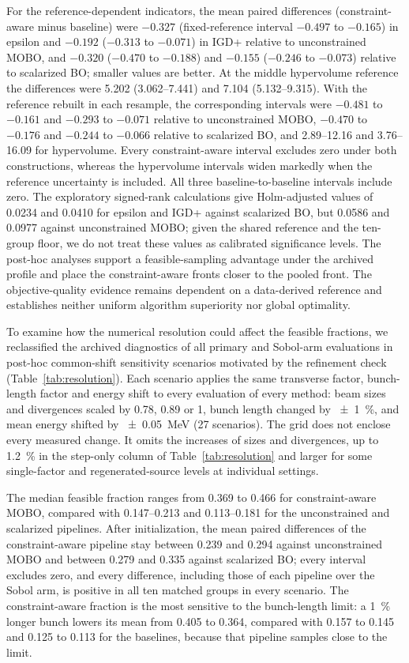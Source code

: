\documentclass[aps,prab,reprint,superscriptaddress,amsmath,amssymb,floatfix]{revtex4-2}
\begin{document}
For the reference-dependent indicators, the mean paired differences (constraint-aware minus
baseline) were $-0.327$ (fixed-reference interval $-0.497$ to $-0.165$) in epsilon and $-0.192$
($-0.313$ to $-0.071$) in IGD+ relative to unconstrained MOBO, and $-0.320$ ($-0.470$ to
$-0.188$) and $-0.155$ ($-0.246$ to $-0.073$) relative to scalarized BO; smaller values are
better. At the middle hypervolume reference the differences were 5.202 (3.062--7.441) and 7.104
(5.132--9.315). With the reference rebuilt in each resample, the corresponding intervals were
$-0.481$ to $-0.161$ and $-0.293$ to $-0.071$ relative to unconstrained MOBO, $-0.470$ to
$-0.176$ and $-0.244$ to $-0.066$ relative to scalarized BO, and 2.89--12.16 and 3.76--16.09 for
hypervolume. Every constraint-aware interval excludes zero under both constructions, whereas the
hypervolume intervals widen markedly when the reference uncertainty is included. All three
baseline-to-baseline intervals include zero. The exploratory signed-rank calculations give
Holm-adjusted values of 0.0234 and 0.0410 for epsilon and IGD+ against scalarized BO, but 0.0586
and 0.0977 against unconstrained MOBO; given the shared reference and the ten-group floor, we do
not treat these values as calibrated significance levels. The post-hoc analyses support a
feasible-sampling advantage under the archived profile and place the constraint-aware fronts
closer to the pooled front. The objective-quality evidence remains dependent on a data-derived
reference and establishes neither uniform algorithm superiority nor global optimality.

To examine how the numerical resolution could affect the feasible fractions, we reclassified the
archived diagnostics of all primary and Sobol-arm evaluations in post-hoc common-shift
sensitivity scenarios motivated by the refinement check (Table~\ref{tab:resolution}). Each
scenario applies the same transverse factor, bunch-length factor and energy shift to every
evaluation of every method: beam sizes and divergences scaled by 0.78, 0.89 or 1, bunch length
changed by \SI{\pm1}{\percent}, and mean energy shifted by \SI{\pm0.05}{\mega\electronvolt} (27
scenarios). The grid does not enclose every measured change. It omits the increases of sizes and
divergences, up to \SI{1.2}{\percent} in the step-only column of Table~\ref{tab:resolution} and
larger for some single-factor and regenerated-source levels at individual settings.

The median feasible fraction ranges from 0.369 to 0.466 for constraint-aware MOBO, compared with
0.147--0.213 and 0.113--0.181 for the unconstrained and scalarized pipelines. After
initialization, the mean paired differences of the constraint-aware pipeline stay between 0.239
and 0.294 against unconstrained MOBO and between 0.279 and 0.335 against scalarized BO; every
interval excludes zero, and every difference, including those of each pipeline over the Sobol
arm, is positive in all ten matched groups in every scenario. The constraint-aware fraction is
the most sensitive to the bunch-length limit: a \SI{1}{\percent} longer bunch lowers its mean
from 0.405 to 0.364, compared with 0.157 to 0.145 and 0.125 to 0.113 for the baselines, because
that pipeline samples close to the limit.
\end{document}
